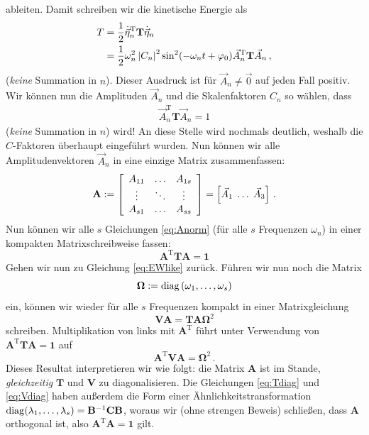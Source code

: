 \documentclass[paper=a4, fontsize=11.0pt, abstractoff, DIV12]{scrartcl}
\begin{document}
ableiten. Damit schreiben wir die kinetische Energie als
\begin{align}
T &= \frac{1}{2}\dot{\vec{\eta}}_n^\mathrm{T} \mathbf{T} \dot{\vec{\eta}}_n\nonumber\\
&= \frac{1}{2} \omega_n^2 \abs{C_n}^2 \sin^2(-\omega_n t +\varphi_0) \vec A^\mathrm{T}_n\mathbf{T}\vec{A}_n \, ,
\end{align}
(\emph{keine} Summation in $n$). 
Dieser Ausdruck ist für $\vec{A}_n \ne \vec 0$ auf jeden Fall positiv. Wir können
nun die Amplituden $\vec{A}_n$ und die Skalenfaktoren $C_n$ so wählen, dass
\begin{align}
\vec A^\mathrm{T}_n\mathbf{T}\vec{A}_n = 1
\label{eq:Anorm}
\end{align}
(\emph{keine} Summation in $n$) wird! An diese Stelle wird nochmals deutlich, weshalb die $C$-Faktoren
überhaupt eingeführt wurden. Nun können wir alle Amplitudenvektoren $\vec
A_n$ in eine einzige Matrix zusammenfassen:
\begin{equation}
\mathbf{A} := \threeMatrix{A_{11}}{\dots}{A_{1s}}{\vdots}{\ddots}{\vdots}{A_{s1}}{\dots}{A_{ss}} = \left[\vec A_1\; \dots\;\vec A_3\right]\,.
\end{equation}
Nun können wir alle $s$ Gleichungen \eqref{eq:Anorm} (für alle $s$ Frequenzen
$\omega_n$) in einer kompakten Matrixschreibweise fassen:
\begin{equation}
\mathbf{A}^\mathrm{T} \mathbf{T} \mathbf{A} = \mathbf{1}
\label{eq:Tdiag}
\end{equation}
Gehen wir nun zu Gleichung \eqref{eq:EWlike} zurück. Führen wir nun noch die
Matrix
\begin{equation}
\mathbf{\Omega} := \operatorname{diag}\left(\omega_1, \dots,\omega_s\right)
\end{equation}
ein, können wir wieder für alle $s$ Frequenzen kompakt in einer Matrixgleichung
\begin{equation}
\mathbf{V}\mathbf{A} = \mathbf{T}\mathbf{A}\mathbf{\Omega}^2
\end{equation}
schreiben. Multiplikation von links mit $\mathbf{A}^\mathrm{T}$ führt
unter Verwendung von $\mathbf{A}^\mathrm{T}\mathbf{T}\mathbf{A}=\mathbf{1}$ auf
\begin{equation}
\mathbf{A}^\mathrm{T}\mathbf{V}\mathbf{A} = \mathbf{\Omega}^2\,.
\label{eq:Vdiag}
\end{equation}
Dieses Resultat interpretieren wir wie folgt: die Matrix $\mathbf{A}$ ist im Stande,
\emph{gleichzeitig} $\mathbf{T}$ und $\mathbf{V}$ zu diagonalisieren. Die
Gleichungen \eqref{eq:Tdiag} und \eqref{eq:Vdiag} haben außerdem die Form einer
Ähn\-lich\-keits\-trans\-for\-mation $\operatorname{diag}(\lambda_1,\dots,\lambda_s) = \mathbf{B}^{-1}\mathbf{C}\mathbf{B}$,
woraus wir (ohne strengen Beweis) schließen, dass $\mathbf{A}$ orthogonal ist, also
$\mathbf{A}^\mathrm{T}\mathbf{A}=\mathbf{1}$ gilt.
\end{document}
